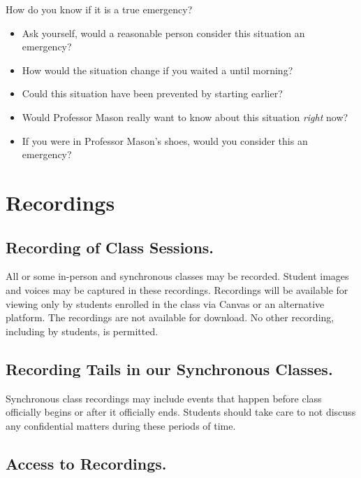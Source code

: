 How do you know if it is a true emergency?

\begin{itemize}
\tightlist
\item
  Ask yourself, would a reasonable person consider this situation an emergency?
\item
  How would the situation change if you waited a until morning?
\item
  Could this situation have been prevented by starting earlier?
\item
  Would Professor Mason really want to know about this situation \emph{right} now?
\item
  If you were in Professor Mason's shoes, would you consider this an emergency?
\end{itemize}

\hypertarget{recordings}{%
\section{Recordings}\label{recordings}}

\hypertarget{recording-of-class-sessions.}{%
\subsection{Recording of Class Sessions.}\label{recording-of-class-sessions.}}

All or some in-person and synchronous classes may be recorded. Student images and voices may be captured in these recordings. Recordings will be available for viewing only by students enrolled in the class via Canvas or an alternative platform. The recordings are not available for download. No other recording, including by students, is permitted.

\hypertarget{recording-tails-in-our-synchronous-classes.}{%
\subsection{Recording Tails in our Synchronous Classes.}\label{recording-tails-in-our-synchronous-classes.}}

Synchronous class recordings may include events that happen before class officially begins or after it officially ends. Students should take care to not discuss any confidential matters during these periods of time.

\hypertarget{access-to-recordings.}{%
\subsection{Access to Recordings.}\label{access-to-recordings.}}

